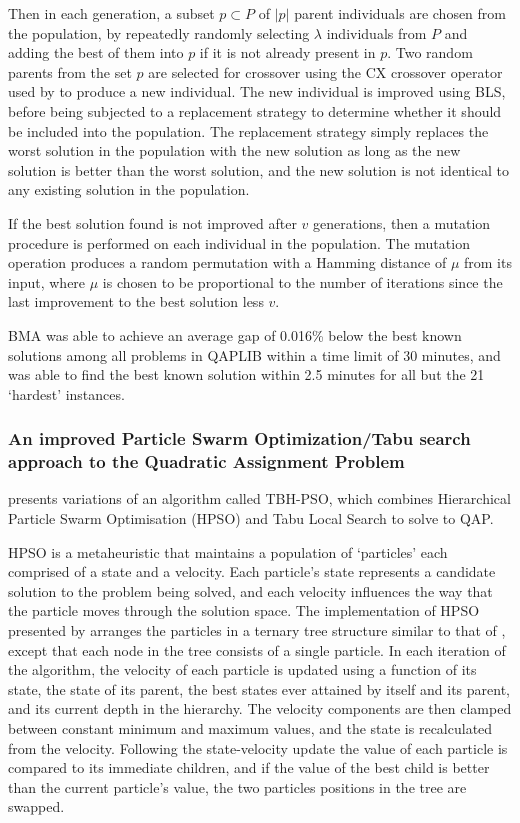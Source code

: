 {{    	Then in each generation, a subset \(p \subset P\) of \(|p|\) parent individuals are chosen from the population, by repeatedly randomly selecting \(\lambda\) individuals from \(P\) and adding the best of them into \(p\) if it is not already present in \(p\).
    	Two random parents from the set \(p\) are selected for crossover using the CX crossover operator used by \citet{Merz:2000ek} to produce a new individual. %
    	The new individual is improved using BLS, before being subjected to a replacement strategy to determine whether it should be included into the population. The replacement strategy simply replaces the worst solution in the population with the new solution as long as the new solution is better than the worst solution, and the new solution is not identical to any existing solution in the population.

    	If the best solution found is not improved after \(v\) generations, then a mutation procedure is performed on each individual in the population. The mutation operation produces a random permutation with a Hamming distance of \(\mu\) from its input, where \(\mu\) is chosen to be proportional to the number of iterations since the last improvement to the best solution less \(v\).

    	BMA was able to achieve an average gap of 0.016\% below the best known solutions among all problems in QAPLIB within a time limit of 30 minutes, and was able to find the best known solution within 2.5 minutes for all but the 21 `hardest' instances.
    }


    \subsubsection*{An improved Particle Swarm Optimization/Tabu search approach to the Quadratic Assignment Problem} {
    	\citet{Helal:2015de} presents variations of an algorithm called TBH-PSO, which combines Hierarchical Particle Swarm Optimisation (HPSO) and Tabu Local Search to solve to QAP.

    	HPSO is a metaheuristic that maintains a population of `particles' each comprised of a state and a velocity. Each particle's state represents a candidate solution to the problem being solved, and each velocity influences the way that the particle moves through the solution space.
    	The implementation of HPSO presented by \citeauthor{Helal:2015de} arranges the particles in a ternary tree structure similar to that of \citet{Harris:2015kw}, except that each node in the tree consists of a single particle.
    	In each iteration of the algorithm, the velocity of each particle is updated using a function of its state, the state of its parent, the best states ever attained by itself and its parent, and its current depth in the hierarchy.
    	The velocity components are then clamped between constant minimum and maximum values, and the state is recalculated from the velocity.
    	Following the state-velocity update the value of each particle is compared to its immediate children, and if the value of the best child is better than the current particle's value, the two particles positions in the tree are swapped.

}}
